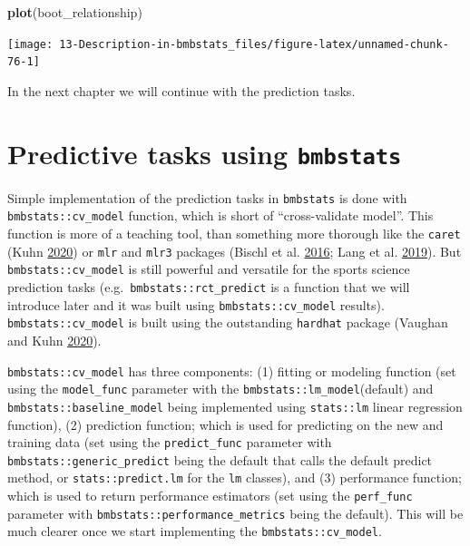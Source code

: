\documentclass[
]{book}
\newenvironment{Shaded}{\begin{snugshade}}{\end{snugshade}}
\newcommand{\KeywordTok}[1]{\textcolor[rgb]{0.13,0.29,0.53}{\textbf{#1}}}
\newcommand{\NormalTok}[1]{#1}
\begin{document}
\begin{Shaded}
\begin{Highlighting}[]
\KeywordTok{plot}\NormalTok{(boot\_relationship)}
\end{Highlighting}
\end{Shaded}

\begin{center}\texttt{[image: 13-Description-in-bmbstats\_files/figure-latex/unnamed-chunk-76-1]} \end{center}

In the next chapter we will continue with the prediction tasks.

\hypertarget{predictive-tasks-using-bmbstats}{%
\chapter{\texorpdfstring{Predictive tasks using \texttt{bmbstats}}{Predictive tasks using bmbstats}}\label{predictive-tasks-using-bmbstats}}

Simple implementation of the prediction tasks in \texttt{bmbstats} is done with \texttt{bmbstats::cv\_model} function, which is short of ``cross-validate model''. This function is more of a teaching tool, than something more thorough like the \texttt{caret} (Kuhn \protect\hyperlink{ref-R-caret}{2020}) or \texttt{mlr} and \texttt{mlr3} packages (Bischl et al. \protect\hyperlink{ref-R-mlr}{2016}; Lang et al. \protect\hyperlink{ref-R-mlr3}{2019}). But \texttt{bmbstats::cv\_model} is still powerful and versatile for the sports science prediction tasks (e.g.~\texttt{bmbstats::rct\_predict} is a function that we will introduce later and it was built using \texttt{bmbstats::cv\_model} results). \texttt{bmbstats::cv\_model} is built using the outstanding \texttt{hardhat} package (Vaughan and Kuhn \protect\hyperlink{ref-R-hardhat}{2020}).

\texttt{bmbstats::cv\_model} has three components: (1) fitting or modeling function (set using the \texttt{model\_func} parameter with the \texttt{bmbstats::lm\_model}(default) and \texttt{bmbstats::baseline\_model} being implemented using \texttt{stats::lm} linear regression function), (2) prediction function; which is used for predicting on the new and training data (set using the \texttt{predict\_func} parameter with \texttt{bmbstats::generic\_predict} being the default that calls the default predict method, or \texttt{stats::predict.lm} for the \texttt{lm} classes), and (3) performance function; which is used to return performance estimators (set using the \texttt{perf\_func} parameter with \texttt{bmbstats::performance\_metrics} being the default). This will be much clearer once we start implementing the \texttt{bmbstats::cv\_model}.
\end{document}
